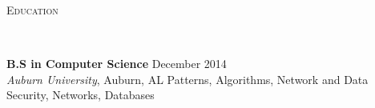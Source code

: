 \documentclass[9pt]{article}
\newenvironment{changemargin}[2]{%
  \begin{list}{}{%
      \setlength{\topsep}{0pt}%
      \setlength{\leftmargin}{#1}%
      \setlength{\rightmargin}{#2}%
      \setlength{\listparindent}{\parindent}%
      \setlength{\itemindent}{\parindent}%
      \setlength{\parsep}{\parskip}%
    }%
  \item[]}{\end{list}
}
\newcommand{\lineover}{
  \begin{changemargin}{-0.05in}{-0.05in}
    \vspace*{-8pt}
    \hrulefill{} \\
    \vspace*{-2pt}
  \end{changemargin}
}
\newcommand{\header}[1]{
  \begin{changemargin}{-0.5in}{-0.5in}
    \scshape{#1}\\
    \lineover{}
  \end{changemargin}
}
\newenvironment{body} {
  \vspace*{-16pt}
  \begin{changemargin}{-0.25in}{-0.5in}
  }	
  {\end{changemargin}
}
\begin{document}
\smallskip





\header{Education}

\begin{body}
  \vspace{17pt}
  \textbf{B.S in Computer Science}{} \hfill December 2014{} \\
  \emph{Auburn University}, Auburn, AL{} %
  \hspace{4ex} Patterns, Algorithms, Network and Data Security, Networks, Databases
\end{body}

\smallskip



\end{document}
